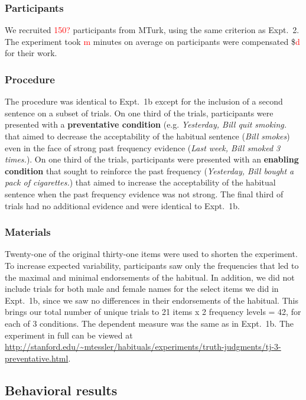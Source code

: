 \documentclass[10pt,letterpaper]{article}
\newcommand{\red}[1]{\textcolor{Red}{#1}}
\begin{document}
\subsubsection{Participants} 

We recruited \red{150?} participants from MTurk, using the same criterion as Expt.~2.
The experiment took \red{m} minutes on average on participants were compensated \$\red{d} for their work.

\subsubsection{Procedure}

The procedure was identical to Expt.~1b except for the inclusion of a second sentence on a subset of trials. 
On one third of the trials, participants were presented with a \textbf{preventative condition} (e.g. \emph{Yesterday, Bill quit smoking.} that aimed to decrease the acceptability of the habitual sentence (\emph{Bill smokes}) even in the face of strong past frequency evidence (\emph{Last week, Bill smoked 3 times.}).
On one third of the trials, participants were presented with an \textbf{enabling condition} that sought to reinforce the past frequency (\emph{Yesterday, Bill bought a pack of cigarettes.}) that aimed to increase the acceptability of the habitual sentence when the past frequency evidence was not strong. 
The final third of trials had no additional evidence and were identical to Expt.~1b. 

\subsubsection{Materials}

Twenty-one of the original thirty-one items were used to shorten the experiment.
To increase expected variability, participants saw only the frequencies that led to the maximal and minimal endorsements of the habitual. 
In addition, we did not include trials for both male and female names for the select items we did in Expt.~1b, since we saw no differences in their endorsements of the habitual.
This brings our total number of unique trials to 21 items x 2 frequency levels = 42, for each of 3 conditions.
The dependent measure was the same as in Expt.~1b. 
The experiment in full can be viewed at \url{http://stanford.edu/~mtessler/habituals/experiments/truth-judgments/tj-3-preventative.html}.

\subsection{Behavioral results}
\end{document}
